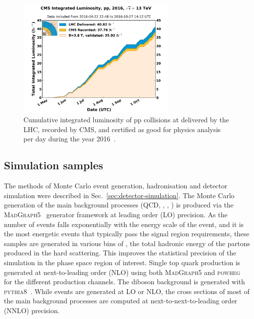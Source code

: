 \begin{figure}[!htb]
\includegraphics[width=0.7\textwidth]{figs/analysis/cmslumi}
\caption{Cumulative integrated luminosity of pp collisions at \com delivered by 
the LHC, recorded by CMS, and certified as good for physics analysis per day 
during the year 2016~\cite{cmslumi16}.}
\label{fig:lumi}
\end{figure}


\subsection{Simulation samples}
\label{sec:analysis-samples-mc}

The methods of Monte Carlo event generation, hadronisation and detector 
simulation were described in Sec.~\ref{sec:detector-simulation}.
The Monte Carlo generation of the main background processes (QCD, \zj, \wj, 
\ttbar) is produced via the \textsc{MadGraph5}~\cite{madgraph,madgraph-amcnlo} 
generator framework at leading order (LO) precision. 
As the number of events falls exponentially with the energy scale of the event, 
and it is the most energetic events that typically pass the signal region 
requirements, these samples are generated in various bins of \hthat, the total 
hadronic energy of the partons produced in the hard scattering. 
This improves the statistical precision of the simulation in the phase space 
region of interest.
Single top quark production is generated at next-to-leading order (NLO) using 
both \textsc{MadGraph5} and \textsc{powheg}~\cite{powheg} for the different 
production channels. The diboson background is generated with 
\textsc{pythia8}~\cite{pythia}.
While events are generated at LO or NLO, the cross sections of most of the main 
background processes are computed at next-to-next-to-leading order (NNLO) 
precision.%

